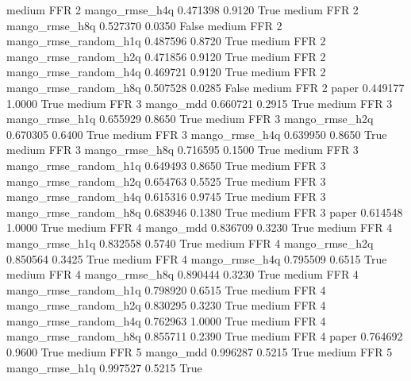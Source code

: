     medium      FFR                 2        mango_rmse_h4q   0.471398      0.9120    True
    medium      FFR                 2        mango_rmse_h8q   0.527370      0.0350   False
    medium      FFR                 2 mango_rmse_random_h1q   0.487596      0.8720    True
    medium      FFR                 2 mango_rmse_random_h2q   0.471856      0.9120    True
    medium      FFR                 2 mango_rmse_random_h4q   0.469721      0.9120    True
    medium      FFR                 2 mango_rmse_random_h8q   0.507528      0.0285   False
    medium      FFR                 2                 paper   0.449177      1.0000    True
    medium      FFR                 3             mango_mdd   0.660721      0.2915    True
    medium      FFR                 3        mango_rmse_h1q   0.655929      0.8650    True
    medium      FFR                 3        mango_rmse_h2q   0.670305      0.6400    True
    medium      FFR                 3        mango_rmse_h4q   0.639950      0.8650    True
    medium      FFR                 3        mango_rmse_h8q   0.716595      0.1500    True
    medium      FFR                 3 mango_rmse_random_h1q   0.649493      0.8650    True
    medium      FFR                 3 mango_rmse_random_h2q   0.654763      0.5525    True
    medium      FFR                 3 mango_rmse_random_h4q   0.615316      0.9745    True
    medium      FFR                 3 mango_rmse_random_h8q   0.683946      0.1380    True
    medium      FFR                 3                 paper   0.614548      1.0000    True
    medium      FFR                 4             mango_mdd   0.836709      0.3230    True
    medium      FFR                 4        mango_rmse_h1q   0.832558      0.5740    True
    medium      FFR                 4        mango_rmse_h2q   0.850564      0.3425    True
    medium      FFR                 4        mango_rmse_h4q   0.795509      0.6515    True
    medium      FFR                 4        mango_rmse_h8q   0.890444      0.3230    True
    medium      FFR                 4 mango_rmse_random_h1q   0.798920      0.6515    True
    medium      FFR                 4 mango_rmse_random_h2q   0.830295      0.3230    True
    medium      FFR                 4 mango_rmse_random_h4q   0.762963      1.0000    True
    medium      FFR                 4 mango_rmse_random_h8q   0.855711      0.2390    True
    medium      FFR                 4                 paper   0.764692      0.9600    True
    medium      FFR                 5             mango_mdd   0.996287      0.5215    True
    medium      FFR                 5        mango_rmse_h1q   0.997527      0.5215    True
